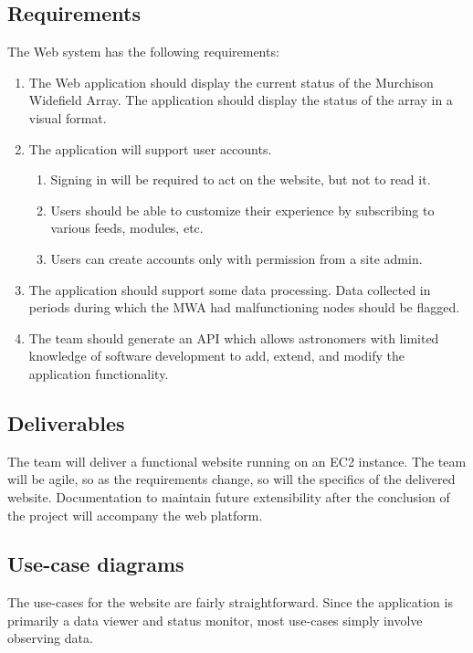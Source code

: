 \documentclass[12pt]{article}
\begin{document}
\begin{spacing}{1.5}
\section{Requirements}
The Web system has the following requirements:
\begin{enumerate}
\item The Web application should display the current status of the Murchison Widefield Array. The application should display the status of the array in a visual format.
\item The application will support user accounts.
	\begin{enumerate}
	\item Signing in will be required to act on the website, but not to read it.
	\item Users should be able to customize their experience by subscribing to various feeds, modules, etc.
	\item Users can create accounts only with permission from a site admin.
	\end{enumerate}
\item The application should support some data processing. Data collected in periods during which the MWA had malfunctioning nodes should be flagged.
\item The team should generate an API which allows astronomers with limited knowledge of software development to add, extend, and modify the application functionality.
\end{enumerate}

\subsection{Deliverables}
The team will deliver a functional website running on an EC2 instance. The team will be agile, so as the requirements change, so will the specifics of the delivered website. Documentation to maintain future extensibility after the conclusion of the project will accompany the web platform.

\subsection{Use-case diagrams}
The use-cases for the website are fairly straightforward. Since the application is primarily a data viewer and status monitor, most use-cases simply involve observing data.

\end{spacing}
\end{document}
